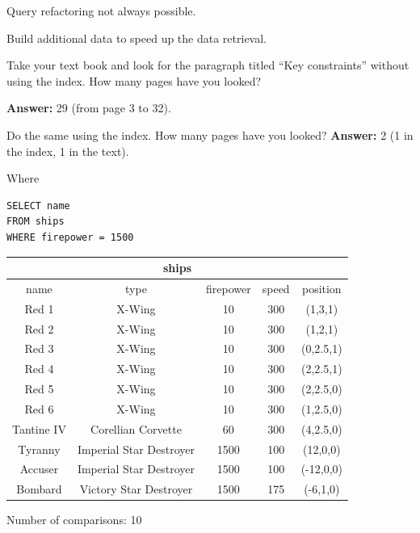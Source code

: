 \documentclass{beamer}
\begin{document}
\begin{slide}{
\item Query refactoring not always possible.
\item Build additional data to speed up the data retrieval.
}\end{slide}

\begin{slide}{
\item Take your text book and look for the paragraph titled ``Key constraints'' without using the index. How many pages have you looked?
\pause
\item \textbf{Answer:} 29 (from page 3 to 32).
\pause
\item Do the same using the index. How many pages have you looked?
\pause
\textbf{Answer:} 2 (1 in the index, 1 in the text).
}\end{slide}

\begin{frame}[fragile]{Where}
\begin{lstlisting}
SELECT name
FROM ships
WHERE firepower = 1500
\end{lstlisting}
\tiny
\begin{tabular}{|c|c|c|c|c|}
\hline
\multicolumn{5}{|c|}{\textbf{ships}} \\
\hline
name & type & firepower & speed & position \\
\hline
Red 1 & X-Wing & 10 & 300 & (1,3,1) \\
\hline
Red 2 & X-Wing & 10 & 300 & (1,2,1) \\
\hline
Red 3 & X-Wing & 10 & 300 & (0,2.5,1) \\
\hline
Red 4 & X-Wing & 10 & 300 & (2,2.5,1) \\
\hline
Red 5 & X-Wing & 10 & 300 & (2,2.5,0) \\
\hline
Red 6 & X-Wing & 10 & 300 & (1,2.5,0) \\
\hline
Tantine IV & Corellian Corvette & 60 & 300 & (4,2.5,0) \\
\hline
Tyranny & Imperial Star Destroyer & 1500 & 100 & (12,0,0) \\
\hline
Accuser & Imperial Star Destroyer & 1500 & 100& (-12,0,0)\\
\hline
Bombard & Victory Star Destroyer & 1500 & 175 & (-6,1,0)\\
\hline
\end{tabular}

\pause
Number of comparisons: 10
\end{frame}
\end{document}
